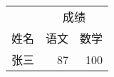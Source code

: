 \begin{tabular}{|c|r|r|}
\hline
& \multicolumn{2}{c|}{成绩}\\ \cline{2-3}
姓名 & 语文 & 数学 \\ \hline
张三 & 87 & 100 \\ \hline
\end{tabular}
